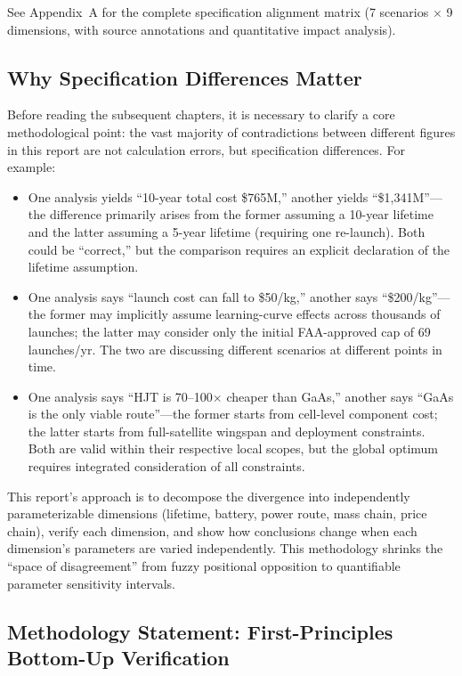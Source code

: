 See Appendix~A for the complete specification alignment matrix (7 scenarios $\times$ 9 dimensions, with source annotations and quantitative impact analysis).

\subsection{Why Specification Differences Matter}

Before reading the subsequent chapters, it is necessary to clarify a core methodological point: the vast majority of contradictions between different figures in this report are not calculation errors, but specification differences. For example:

\begin{itemize}[leftmargin=*]
    \item One analysis yields ``10-year total cost \$765M,'' another yields ``\$1,341M''---the difference primarily arises from the former assuming a 10-year lifetime and the latter assuming a 5-year lifetime (requiring one re-launch). Both could be ``correct,'' but the comparison requires an explicit declaration of the lifetime assumption.
    \item One analysis says ``launch cost can fall to \$50/kg,'' another says ``\$200/kg''---the former may implicitly assume learning-curve effects across thousands of launches; the latter may consider only the initial FAA-approved cap of 69 launches/yr. The two are discussing different scenarios at different points in time.
    \item One analysis says ``HJT is 70--100$\times$ cheaper than GaAs,'' another says ``GaAs is the only viable route''---the former starts from cell-level component cost; the latter starts from full-satellite wingspan and deployment constraints. Both are valid within their respective local scopes, but the global optimum requires integrated consideration of all constraints.
\end{itemize}

This report's approach is to decompose the divergence into independently parameterizable dimensions (lifetime, battery, power route, mass chain, price chain), verify each dimension, and show how conclusions change when each dimension's parameters are varied independently. This methodology shrinks the ``space of disagreement'' from fuzzy positional opposition to quantifiable parameter sensitivity intervals.

\subsection{Methodology Statement: First-Principles Bottom-Up Verification}

